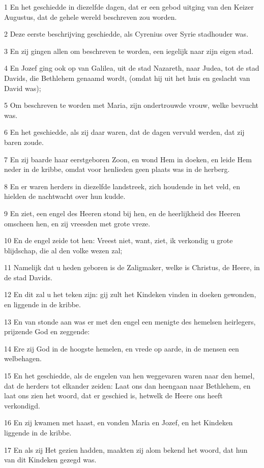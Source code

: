 \par 1 En het geschiedde in diezelfde dagen, dat er een gebod uitging van den Keizer Augustus, dat de gehele wereld beschreven zou worden.
\par 2 Deze eerste beschrijving geschiedde, als Cyrenius over Syrie stadhouder was.
\par 3 En zij gingen allen om beschreven te worden, een iegelijk naar zijn eigen stad.
\par 4 En Jozef ging ook op van Galilea, uit de stad Nazareth, naar Judea, tot de stad Davids, die Bethlehem genaamd wordt, (omdat hij uit het huis en geslacht van David was);
\par 5 Om beschreven te worden met Maria, zijn ondertrouwde vrouw, welke bevrucht was.
\par 6 En het geschiedde, als zij daar waren, dat de dagen vervuld werden, dat zij baren zoude.
\par 7 En zij baarde haar eerstgeboren Zoon, en wond Hem in doeken, en leide Hem neder in de kribbe, omdat voor henlieden geen plaats was in de herberg.
\par 8 En er waren herders in diezelfde landstreek, zich houdende in het veld, en hielden de nachtwacht over hun kudde.
\par 9 En ziet, een engel des Heeren stond bij hen, en de heerlijkheid des Heeren omscheen hen, en zij vreesden met grote vreze.
\par 10 En de engel zeide tot hen: Vreest niet, want, ziet, ik verkondig u grote blijdschap, die al den volke wezen zal;
\par 11 Namelijk dat u heden geboren is de Zaligmaker, welke is Christus, de Heere, in de stad Davids.
\par 12 En dit zal u het teken zijn: gij zult het Kindeken vinden in doeken gewonden, en liggende in de kribbe.
\par 13 En van stonde aan was er met den engel een menigte des hemelsen heirlegers, prijzende God en zeggende:
\par 14 Ere zij God in de hoogste hemelen, en vrede op aarde, in de mensen een welbehagen.
\par 15 En het geschiedde, als de engelen van hen weggevaren waren naar den hemel, dat de herders tot elkander zeiden: Laat ons dan heengaan naar Bethlehem, en laat ons zien het woord, dat er geschied is, hetwelk de Heere ons heeft verkondigd.
\par 16 En zij kwamen met haast, en vonden Maria en Jozef, en het Kindeken liggende in de kribbe.
\par 17 En als zij Het gezien hadden, maakten zij alom bekend het woord, dat hun van dit Kindeken gezegd was.

